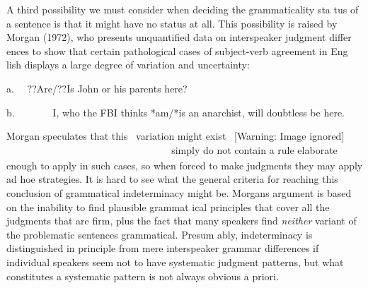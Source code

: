 \begin{styleStandard}
A third possibility we must consider when deciding the grammaticality sta\- tus of a sentence is that it might have no status at all. This possibility is raised by Morgan (1972), who presents unquantified data on interspeaker judgment differ\- ences to show that certain pathological cases of subject-verb agreement in Eng\- lish displays a large degree of variation and uncertainty:
\end{styleStandard}


\setcounter{listWWNumlxileveli}{3}
\begin{listWWNumlxileveli}
\item 
\begin{styleStandard}
a. \ \ ??Are/??Is John or his parents here?
\end{styleStandard}


\end{listWWNumlxileveli}
\begin{styleStandard}
b. \ \ \ \ \ \ \ I, who the FBI thinks *am/*is an anarchist, will doubtless be here.
\end{styleStandard}


\begin{styleStandard}
Morgan speculates that this \ variation might exist \   [Warning: Image ignored] %
 \textsubscript{ }\textsubscript{\ \ \ \ \ \ \ \ \ \ \ \ \ \ \ \ \ \ \ \ \ \ \ \ \ \ \ \ \ \ \ \ \ \ \ \ \ \ \ \ }simply do not contain a rule elaborate enough to apply in such cases, so when forced to make judgments they may apply ad hoe strategies. It is hard to see what the general criteria for reaching this conclusion of grammatical indeterminacy might be. Morgan{\textquotesingle}s argument is based on the inability to find plausible grammat\- ical principles that cover all the judgments that are firm, plus the fact that many speakers find \textit{neither}\textit{ }variant of the problematic sentences grammatical. Presum\- ably, indeterminacy is distinguished in principle from mere interspeaker grammar differences if individual speakers seem not to have systematic judgment patterns, but what constitutes a systematic pattern is not always obvious a priori.
\end{styleStandard}


